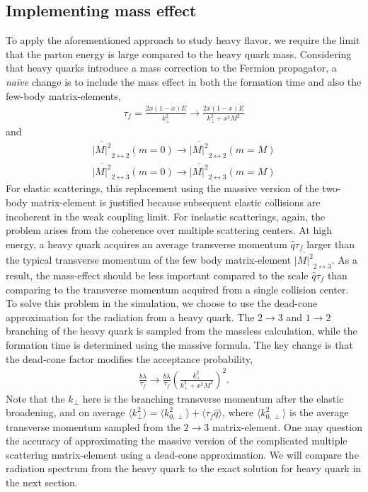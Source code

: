 \subsection{Implementing mass effect}
To apply the aforementioned approach to study heavy flavor, we require
the limit that the parton energy is large compared to the heavy quark mass.
Considering that heavy quarks introduce a mass correction to the Fermion propagator, a {\it na\"ive } change is to include the mass effect in both the formation time and also the few-body matrix-elements,
\begin{eqnarray}
\tau_f = \frac{2x(1-x)E}{k_\perp^2} \rightarrow \frac{2x(1-x)E}{k_\perp^2 + x^2 M^2}
\end{eqnarray}
and 
\begin{eqnarray}
\overline{|M|^2}_{2\leftrightarrow 2}(m=0) \rightarrow \overline{|M|^2}_{2\leftrightarrow 2}(m=M)\\
\overline{|M|^2}_{2\leftrightarrow 3}(m=0) \rightarrow \overline{|M|^2}_{2\leftrightarrow 3}(m=M)
\end{eqnarray}
For elastic scatterings, this replacement using the massive version of the two-body matrix-element is justified because subsequent elastic collisions are incoherent in the weak coupling limit.
For inelastic scatterings, again, the problem arises from the coherence over multiple scattering centers.
At high energy, a heavy quark acquires an average transverse momentum $\hat{q} \tau_f$ larger than the typical transverse momentum of the few body matrix-element $\overline{|M|^2}_{2\leftrightarrow 3}$.
As a result, the mass-effect should be less important compared to the scale $\hat{q} \tau_f$ than comparing to the transverse momentum acquired from a single collision center. 
To solve this problem in the simulation, we choose to use the dead-cone approximation for the radiation from a heavy quark.
The $2\rightarrow 3$ and $1\rightarrow 2$ branching of the heavy quark is sampled from the massless calculation, while the formation time is determined using the massive formula.
The key change is that the dead-cone factor modifies the acceptance probability,
\begin{eqnarray}
\frac{b\lambda}{\tau_f} \rightarrow \frac{b\lambda}{\tau_f} \left(\frac{k_\perp^2}{k_\perp^2+x^2M^2}\right)^2.
\end{eqnarray}
Note that the $k_\perp$ here is the branching transverse momentum after the elastic broadening, and on average $\langle k_\perp^2 \rangle = \langle k_{0,\perp}^2 \rangle + \langle\tau_f\hat{q}\rangle$, where $\langle k_{0,\perp}^2 \rangle$ is the average transverse momentum sampled from the $2\rightarrow 3$ matrix-element.
One may question the accuracy of approximating the massive version of the complicated multiple scattering matrix-element using a dead-cone approximation.
We will compare the radiation spectrum from the heavy quark to the exact solution for heavy quark in the next section.

